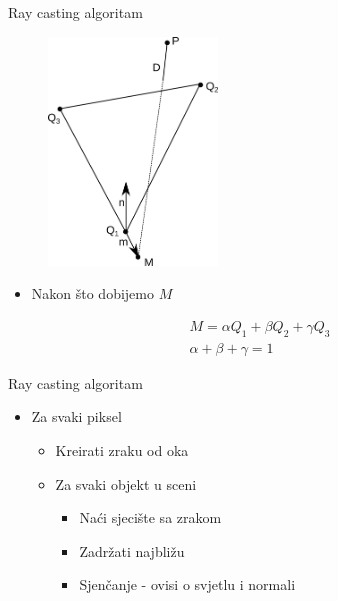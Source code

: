 \documentclass[9pt]{beamer}
\begin{document}
\begin{frame}{Ray casting algoritam}

\begin{figure}
	\includegraphics[width=0.4\textwidth]{./slike/trokut2.png}
\end{figure}
\begin{itemize}
	\item Nakon što dobijemo $M$
\end{itemize}
\begin{align*}
M = \alpha Q_1 + \beta Q_2 + \gamma Q_3 \\
 \alpha + \beta + \gamma = 1
\end{align*}
\end{frame}

\begin{frame}{Ray casting algoritam}
\begin{itemize}
	\item Za svaki piksel
	\begin{itemize}
		\item Kreirati zraku od oka
		\item Za svaki objekt u sceni
		\begin{itemize}
			\item Naći sjecište sa zrakom
			\item Zadržati najbližu
			\item \alert{Sjenčanje - ovisi o svjetlu i normali}
		\end{itemize}
	\end{itemize}
\end{itemize}
\end{frame}
\end{document}
